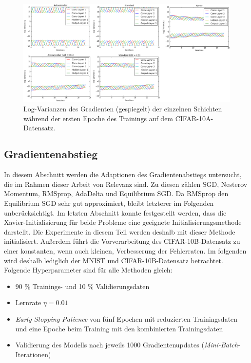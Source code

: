 \begin{figure}[H]
\centering
\includegraphics[width=1.0\linewidth]{images/6_xavier_initialization_cifar}
\caption[]{Log-Varianzen des Gradienten (gespiegelt) der einzelnen Schichten während der ersten Epoche des Trainings auf dem CIFAR-10A-Datensatz.}
\label{fig:6_xavier_initialization_cifar}
\end{figure}


\subsection{Gradientenabstieg}
In diesem Abschnitt werden die Adaptionen des Gradientenabstiegs untersucht, die im Rahmen dieser Arbeit von Relevanz sind. Zu diesen zählen SGD, Nesterov Momentum, RMSprop, AdaDelta und Equilibrium SGD. Da RMSprop den Equilibrium SGD sehr gut approximiert, bleibt letzterer im Folgenden unberücksichtigt. Im letzten Abschnitt konnte festgestellt werden, dass die Xavier-Initialisierung für beide Probleme eine geeignete Initialisierungsmethode darstellt. Die Experimente in diesem Teil werden deshalb mit dieser Methode initialisiert. Außerdem führt die Vorverarbeitung des CIFAR-10B-Datensatz zu einer konstanten, wenn auch kleinen, Verbesserung der Fehlerraten. Im folgenden wird deshalb lediglich der MNIST und CIFAR-10B-Datensatz betrachtet. Folgende Hyperparameter sind für alle Methoden gleich:

\begin{itemize}
\item 90 \% Trainings- und 10 \% Validierungsdaten
\item Lernrate $\eta = 0.01$
\item \textit{Early Stopping Patience} von fünf Epochen mit reduzierten Trainingsdaten und eine Epoche beim Training mit den kombinierten Trainingsdaten
\item Validierung des Modells nach jeweils 1000 Gradientenupdates (\textit{Mini-Batch}-Iterationen)
\end{itemize}

